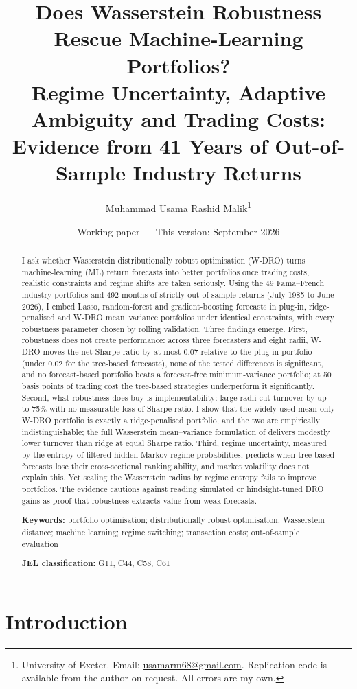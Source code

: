 \documentclass[11pt]{article}
\title{Does Wasserstein Robustness Rescue Machine-Learning Portfolios?\\[4pt]
\large Regime Uncertainty, Adaptive Ambiguity and Trading Costs:\\ Evidence from 41 Years of Out-of-Sample Industry Returns}
\author{Muhammad Usama Rashid Malik\thanks{University of Exeter. Email: \href{mailto:usamarm68@gmail.com}{usamarm68@gmail.com}. Replication code is available from the author on request. All errors are my own.}}
\date{Working paper --- This version: September 2026}
\begin{document}
\maketitle

\begin{abstract}
\noindent
I ask whether Wasserstein distributionally robust optimisation (W-DRO) turns machine-learning (ML) return forecasts into better portfolios once trading costs, realistic constraints and regime shifts are taken seriously. Using the 49 Fama--French industry portfolios and 492 months of strictly out-of-sample returns (July 1985 to June 2026), I embed Lasso, random-forest and gradient-boosting forecasts in plug-in, ridge-penalised and W-DRO mean--variance portfolios under identical constraints, with every robustness parameter chosen by rolling validation. Three findings emerge. First, robustness does not create performance: across three forecasters and eight radii, W-DRO moves the net Sharpe ratio by at most 0.07 relative to the plug-in portfolio (under 0.02 for the tree-based forecasts), none of the tested differences is significant, and no forecast-based portfolio beats a forecast-free minimum-variance portfolio; at 50 basis points of trading cost the tree-based strategies underperform it significantly. Second, what robustness does buy is implementability: large radii cut turnover by up to 75\% with no measurable loss of Sharpe ratio. I show that the widely used mean-only W-DRO portfolio is exactly a ridge-penalised portfolio, and the two are empirically indistinguishable; the full Wasserstein mean--variance formulation of \citet{blanchet2022} delivers modestly lower turnover than ridge at equal Sharpe ratio. Third, regime uncertainty, measured by the entropy of filtered hidden-Markov regime probabilities, predicts when tree-based forecasts lose their cross-sectional ranking ability, and market volatility does not explain this. Yet scaling the Wasserstein radius by regime entropy fails to improve portfolios. The evidence cautions against reading simulated or hindsight-tuned DRO gains as proof that robustness extracts value from weak forecasts.

\medskip
\noindent\textbf{Keywords:} portfolio optimisation; distributionally robust optimisation; Wasserstein distance; machine learning; regime switching; transaction costs; out-of-sample evaluation

\noindent\textbf{JEL classification:} G11, C44, C58, C61
\end{abstract}

\newpage
\section{Introduction}
\end{document}
